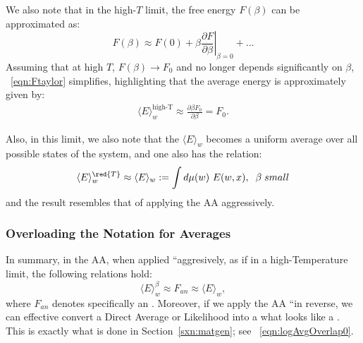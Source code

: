 We also note that in the high-\(T\) limit, the free energy \(F(\beta)\) can be approximated as:
\begin{equation}
 \label{eqn:Ftaylor}
F(\beta) \approx F(0) + \beta \left. \frac{\partial F}{\partial \beta} \right|_{\beta=0} + \dots
\end{equation}
Assuming that at high \(T\), \(F(\beta) \rightarrow F_0\) and no longer depends significantly on \(\beta\), \EQN~\ref{eqn:Ftaylor} simplifies, highlighting that the average energy is approximately given by:
\begin{align}
\label{eqn:Fu2}
\langle E \rangle_{w}^{\text{high-T}} \approx \frac{\partial \beta F_0}{\partial \beta} = F_0.
\end{align}

Also, in this limit, we also note that the \ThermalAverage $\langle E\rangle_{w}$ becomes
a uniform average over all possible states of the system, and one also has the relation:
\begin{equation}
\label{eqn:avgE}
\langle E \rangle_{w}^{\red{T}} \approx
\langle E \rangle_{w}:=
\int d\mu(w) \ E(w,x),\;\;\beta\;small
\end{equation}
and the result resembles that of applying the AA aggressively.



\subsubsection{Overloading the Notation for Averages}

In summary, in the AA, when applied ``aggresively, as if in a high-Temperature limit, the following relations hold: 
\begin{equation}
\label{eqn:FEE}
\langle E \rangle_{w}^{\beta} \approx F_{an} \approx \langle E \rangle_{w}  ,
\end{equation}
where $F_{an}$ denotes specifically an \Annealed \FreeEnergy. 
Moreover, if we apply the AA ``in reverse, we can effective convert a Direct Average or Likelihood into a what looks like a \FreeEnergy.
This is exactly what is done in Section~\ref{sxn:matgen}; see \EQN~\ref{eqn:logAvgOverlap0}.

